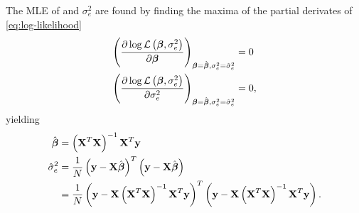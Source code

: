 %
The MLE of \tmat{\beta} and \(\sigma^2_e\) are found by finding the maxima of the partial derivates of \cref{eq:log-likelihood} 
%
\begin{align}
\left(\frac{\partial\log\mathcal{L}\left(\boldsymbol{\mathbf{\beta}},\sigma^2_e\right)}{\partial \boldsymbol{\mathbf{\beta}}}\right)_{\boldsymbol{\mathbf{\beta}}=\hat{\boldsymbol{\mathbf{\beta}}},\sigma^2_e=\hat{\sigma}^2_e} &= 0 \\
\left(\frac{\partial\log\mathcal{L}\left(\boldsymbol{\mathbf{\beta}},\sigma^2_e\right)}{\partial \sigma^2_e}\right)_{\boldsymbol{\mathbf{\beta}}=\hat{\boldsymbol{\mathbf{\beta}}},\sigma^2_e=\hat{\sigma}^2_e} &= 0, 
\end{align}
%
yielding
%
\begin{align}
\hat{\mat{\beta}} & = \left(\mat{X}^T\mat{X}\right)^{-1}\mat{X}^T\mat{y} \\
\label{eq:beta-MLE}
\hat{\sigma}^2_e &= \frac{1}{N}\left(\mat{y} - \mat{X}\hat{\mat{\beta}}\right)^T\left(\mat{y} - \mat{X}\hat{\mat{\beta}}\right) \\
&= \frac{1}{N}\left(\mat{y} -\mat{X}\left(\mat{X}^T\mat{X}\right)^{-1}\mat{X}^T\mat{y}\right)^T\left(\mat{y} -\mat{X}\left(\mat{X}^T\mat{X}\right)^{-1}\mat{X}^T\mat{y}\right).
\label{eq:sigma-MLE}
\end{align}

